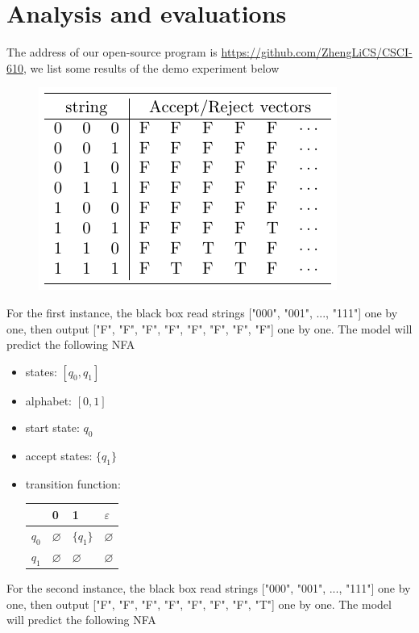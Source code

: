 \documentclass{article}
\begin{document}
\section{Analysis and evaluations}
The address of our open-source program is \href{https://github.com/ZhengLiCS/CSCI-610}{\color{cyan}https://github.com/ZhengLiCS/CSCI-610}, we list some results of the demo experiment below
\begin{figure}[H]
    \centering
    \includegraphics[width=0.75\linewidth]{src/experiments.pdf}
    \label{tab: experiments}
\end{figure}
For the first instance, the black box read strings ["000", "001", ..., "111"] one by one, then output ["F", "F", "F", "F", "F", "F", "F", "F"] one by one. The model will predict the following NFA
\begin{itemize}
    \item states: $[q_0, q_1]$
    \item alphabet: $[0, 1]$
    \item start state: $q_0$
    \item accept states: $\{ q_1 \}$
    \item transition function: 
    \begin{tabular}{l|lll}
              & 0             & 1             & $\varepsilon$ \\ \hline
        $q_0$ & $\varnothing$ & $\{ q_1 \}$   & $\varnothing$ \\   
        $q_1$ & $\varnothing$ & $\varnothing$ & $\varnothing$ \\  
    \end{tabular}
\end{itemize}
For the second instance, the black box read strings ["000", "001", ..., "111"] one by one, then output ["F", "F", "F", "F", "F", "F", "F", "T"] one by one. The model will predict the following NFA
\end{document}
